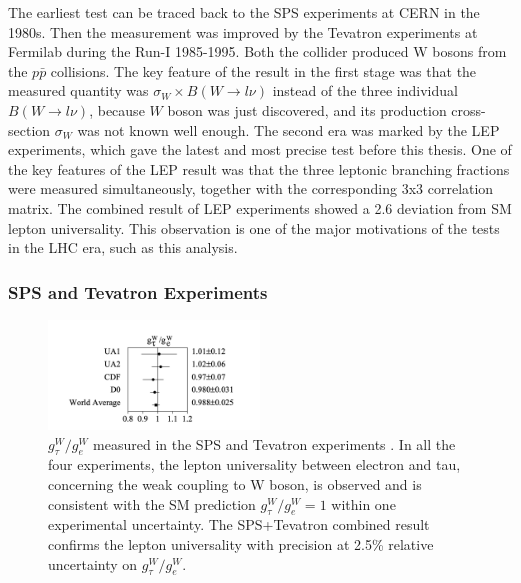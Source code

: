 The earliest test can be traced back to the SPS experiments at CERN in the 1980s. Then the measurement was improved by the Tevatron experiments at Fermilab during the Run-I 1985-1995. Both the collider produced W bosons from the $p\bar{p}$ collisions. The key feature of the result in the first stage was that the measured quantity was $\sigma_W \times B(W\to l\nu)$ instead of the three individual $B(W\to l\nu)$, because $W$ boson was just discovered, and its production cross-section $\sigma_W$ was not known well enough. The second era was marked by the LEP experiments, which gave the latest and most precise test before this thesis. One of the key features of the LEP result was that the three leptonic branching fractions were measured simultaneously, together with the corresponding 3x3 correlation matrix. The combined result of LEP experiments showed a 2.6 \sigma deviation from SM lepton universality. This observation is one of the major motivations of the tests in the LHC era, such as this analysis.


\subsubsection{SPS and Tevatron Experiments}



\begin{figure}[ht]
    \centering
    \includegraphics[width=0.5\textwidth]{chapters/RelatedWorks/sectionLU/figures/spsTevatron.png}
    \caption{ $g^W_\tau / g^W_e$ measured in the SPS and Tevatron experiments \cite{Abbott:1999pk}. In all the four experiments, the lepton universality between electron and tau, concerning the weak coupling to W boson, is observed and is consistent with the SM prediction $g^W_\tau / g^W_e=1$ within one experimental uncertainty. The SPS+Tevatron combined result confirms the lepton universality with precision at 2.5\% relative uncertainty on $g^W_\tau / g^W_e$. }
    \label{fig:relatedWorks:lu:W:spsTevatronCombinedRatio}
\end{figure}


